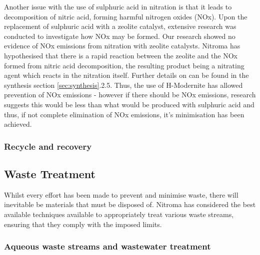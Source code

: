 Another issue with the use of sulphuric acid in nitration is that it leads to decomposition of nitric acid, forming harmful nitrogen oxides (NOx). Upon the replacement of sulphuric acid with a zeolite catalyst, extensive research was conducted to investigate how NOx may be formed. Our research showed no evidence of NOx emissions from nitration with zeolite catalysts. Nitroma has hypothesised that there is a rapid reaction between the zeolite and the NOx formed from nitric acid decomposition, the resulting product being a nitrating agent which reacts in the nitration itself. Further details on can be found in the synthesis section \ref{sec:synthesis}.2.5. Thus, the use of H-Modernite has allowed prevention of NOx emissions - however if there should be NOx emissions, research suggests this would be less than what would be produced with sulphuric acid and thus, if not complete elimination of NOx emissions, it's minimisation has been achieved.  

\subsubsection{Recycle and recovery}


 






\subsection{Waste Treatment}

Whilst every effort has been made to prevent and minimise waste, there will inevitable be materials that must be disposed of. Nitroma has considered the best available techniques available to appropriately treat various waste streams, ensuring that they comply with the imposed limits.  

\subsubsection{Aqueous waste streams and wastewater treatment}

